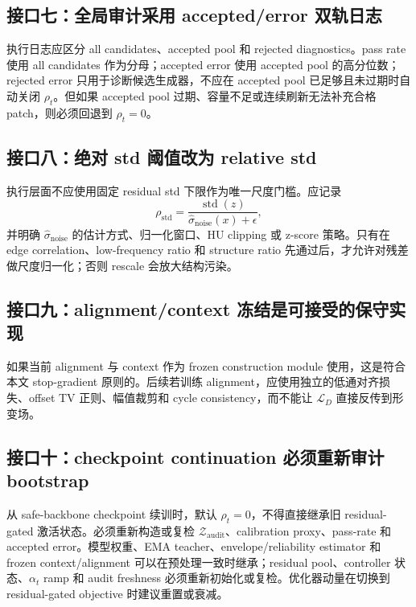 \documentclass[11pt,a4paper,UTF8,fontset=fandol]{ctexart}
\theoremstyle{definition}
\newcommand{\cL}{\mathcal{L}}
\newcommand{\cZ}{\mathcal{Z}}
\begin{document}
\subsection{接口七：全局审计采用 accepted/error 双轨日志}

执行日志应区分 all candidates、accepted pool 和 rejected diagnostics。pass rate 使用 all candidates 作为分母；accepted error 使用 accepted pool 的高分位数；rejected error 只用于诊断候选生成器，不应在 accepted pool 已足够且未过期时自动关闭 $\rho_t$。但如果 accepted pool 过期、容量不足或连续刷新无法补充合格 patch，则必须回退到 $\rho_t=0$。

\subsection{接口八：绝对 std 阈值改为 relative std}

执行层面不应使用固定 residual std 下限作为唯一尺度门槛。应记录
\begin{equation}
    \rho_{\mathrm{std}}=\frac{\operatorname{std}(z)}{\widehat\sigma_{\mathrm{noise}}(x)+\epsilon},
\end{equation}
并明确 $\widehat\sigma_{\mathrm{noise}}$ 的估计方式、归一化窗口、HU clipping 或 z-score 策略。只有在 edge correlation、low-frequency ratio 和 structure ratio 先通过后，才允许对残差做尺度归一化；否则 rescale 会放大结构污染。

\subsection{接口九：alignment/context 冻结是可接受的保守实现}

如果当前 alignment 与 context 作为 frozen construction module 使用，这是符合本文 stop-gradient 原则的。后续若训练 alignment，应使用独立的低通对齐损失、offset TV 正则、幅值裁剪和 cycle consistency，而不能让 $\cL_D$ 直接反传到形变场。


\subsection{接口十：checkpoint continuation 必须重新审计 bootstrap}

从 safe-backbone checkpoint 续训时，默认 $\rho_t=0$，不得直接继承旧 residual-gated 激活状态。必须重新构造或复检 $\cZ_{\mathrm{audit}}$、calibration proxy、pass-rate 和 accepted error。模型权重、EMA teacher、envelope/reliability estimator 和 frozen context/alignment 可以在预处理一致时继承；residual pool、controller 状态、$\alpha_t$ ramp 和 audit freshness 必须重新初始化或复检。优化器动量在切换到 residual-gated objective 时建议重置或衰减。
\end{document}
